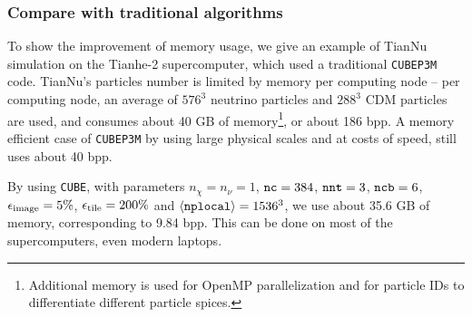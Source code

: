 \documentclass[10pt,twocolumn,preprint]{emulateapj}
\begin{document}
\subsubsection{Compare with traditional algorithms}
To show the improvement of memory usage, we give an example of TianNu simulation \citep{2017NatAs...1E.143Y} on the Tianhe-2 supercomputer, which used a traditional {\tt CUBEP3M} code. TianNu's particles number is limited by memory per computing node -- per computing node, an average of $576^3$ neutrino particles and $288^3$ CDM particles are used, and consumes about 40 GB of memory\footnote{Additional memory is used for OpenMP parallelization and for particle IDs to differentiate different particle spices.}, or about 186 bpp. A memory efficient case of {\tt CUBEP3M} by using large physical scales and at costs of speed, still uses about 40 bpp.

By using {\tt CUBE}, with parameters $n_\chi=n_\nu=1$, ${\tt nc}=384$, ${\tt nnt}=3$, ${\tt ncb}=6$, $\epsilon_{\rm image}=5\%$, $\epsilon_{\rm tile}=200\%$ and $\left\langle {\tt nplocal} \right\rangle=1536^3$, we use about 35.6 GB of memory, corresponding to 9.84 bpp. This can be done on most of the supercomputers, even modern laptops.
\end{document}
